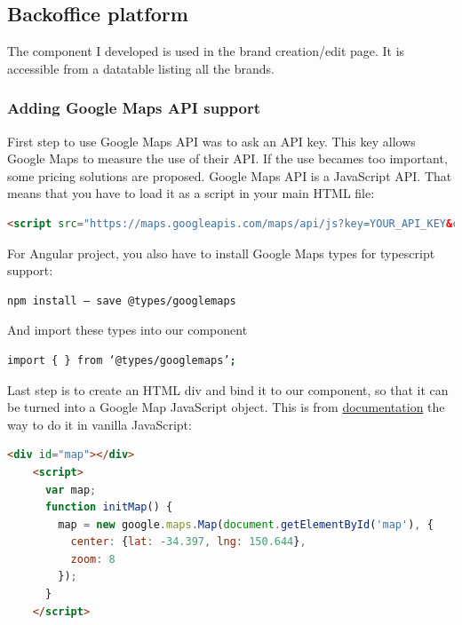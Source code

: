 \documentclass{article}
\begin{document}
            \subsection{Backoffice platform}
                The component I developed is used in the brand creation/edit page. It is accessible from a datatable listing all the brands.

                \subsubsection{Adding Google Maps API support} \label{support}
                    First step to use Google Maps API was to ask an API key. This key allows Google Maps to measure the use of their API. 
                    If the use becames too important, some pricing solutions are proposed. 
                    Google Maps API is a JavaScript API. That means that you have to load it as a script in your main HTML file:
                    \begin{lstlisting}[language=HTML]
    <script src="https://maps.googleapis.com/maps/api/js?key=YOUR_API_KEY&callback=initMap" async defer></script>
                    \end{lstlisting}
                    For Angular project, you also have to install Google Maps types for typescript support:
                    \begin{lstlisting}[language=bash]
    npm install — save @types/googlemaps
                    \end{lstlisting}
                    And import these types into our component
                    \begin{lstlisting}[language=bash]
    import { } from ‘@types/googlemaps’;
                    \end{lstlisting}
                    
                    Last step is to create an HTML div and bind it to our component, so that it can be turned into a Google Map JavaScript object.
                    This is from \href{https://developers.google.com/maps/documentation/javascript/tutorial}{documentation} the way to do it in vanilla
                    JavaScript:
                    \begin{lstlisting}[language=html]
    <div id="map"></div>
    <script>
      var map;
      function initMap() {
        map = new google.maps.Map(document.getElementById('map'), {
          center: {lat: -34.397, lng: 150.644},
          zoom: 8
        });
      }
    </script>
                    \end{lstlisting}
                    
\end{document}
